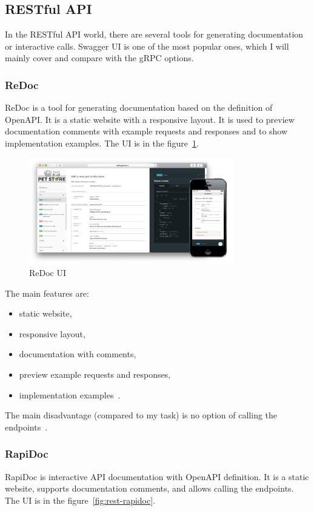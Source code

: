 \subsection{RESTful API}
In the RESTful API world, there are several tools for generating documentation or interactive calls.
Swagger UI is one of the most popular ones, which I will mainly cover and compare with the gRPC options.

\subsubsection{ReDoc}
ReDoc is a tool for generating documentation based on the definition of OpenAPI.
It is a static website with a responsive layout.
It is used to preview documentation comments with example requests and responses and to show implementation examples.
The UI is in the figure~\ref{fig:rest-redoc}.
\cite{rest-redoc}

\begin{figure}[hbt!]
    \centering
    \captionsetup{justification=centering}
    \includegraphics[width=0.8\textwidth]{images/rest/redoc}
    \caption{ReDoc UI~\cite{rest-redoc}}
    \label{fig:rest-redoc}
\end{figure}

The main features are:
\begin{itemize}
    \item static website,
    \item responsive layout,
    \item documentation with comments,
    \item preview example requests and responses,
    \item implementation examples~\cite{rest-redoc}.
\end{itemize}

The main disadvantage (compared to my task) is no option of calling the endpoints~\cite{rest-redoc}.

\subsubsection{RapiDoc}
RapiDoc is interactive API documentation with OpenAPI definition.
It is a static website, supports documentation comments, and allows calling the endpoints.
The UI is in the figure~\ref{fig:rest-rapidoc}.
\cite{rest-rapidoc}

